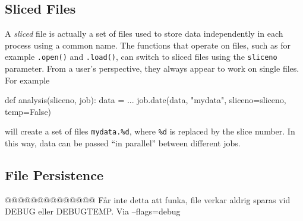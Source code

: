 \subsection{Sliced Files}
\label{sec:slicedfiles}
A \textsl{sliced} file is actually a set of files used to store data
independently in each \analysis process using a common name.  The
functions that operate on files, such as for example \texttt{.open()}
and \texttt{.load()}, can switch to sliced files using
the \texttt{sliceno} parameter.  From a user's perspective, they
always appear to work on single files.  For example
\begin{python}
def analysis(sliceno, job):
    data = ...
    job.date(data, "mydata", sliceno=sliceno, temp=False)
\end{python}
will create a set of files \texttt{mydata.\%d}, where \texttt{\%d} is
replaced by the slice number.  In this way, data can be passed ``in
parallel'' between different jobs.


\subsection{File Persistence}
\label{sec:debugflag}
@@@@@@@@@@@@@@ Får inte detta att funka, file verkar aldrig sparas vid
DEBUG eller DEBUGTEMP.  Via --flags=debug

